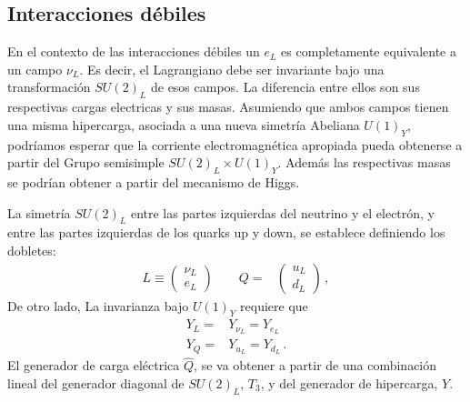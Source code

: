 \begin{frame}
\section{Interacciones débiles}
En el contexto de las interacciones débiles un $e_L$ es completamente
equivalente a un campo $\nu_L$. Es decir, el Lagrangiano debe ser
invariante bajo una transformación $SU(2)_L$ de esos campos. La
diferencia entre ellos son sus respectivas cargas electricas y sus
masas. Asumiendo que ambos campos tienen una misma hipercarga,
asociada a una nueva simetría Abeliana $U(1)_Y$, podríamos esperar que
la corriente electromagnética apropiada pueda obtenerse a partir del
Grupo semisimple $SU(2)_L\times U(1)_Y$. Además las respectivas masas
se podrían obtener a partir del mecanismo de Higgs.

La simetría $SU(2)_L$ entre las partes izquierdas del neutrino y el electrón, y entre las partes izquierdas de los quarks up y down, se establece  definiendo los dobletes:
  \begin{align}
    L\equiv\begin{pmatrix}
      \nu_L\\
      e_L      
    \end{pmatrix}\qquad   Q=&\begin{pmatrix}
    u_L\\
    d_L
  \end{pmatrix}\,,
  \end{align}
De otro lado, La invarianza bajo $U(1)_Y$ requiere que
\begin{align}
  Y_L=&Y_{\nu_L}=Y_{e_L}\nonumber\\
  Y_Q=&Y_{u_L}=Y_{d_L}\,.
\end{align}
El generador de carga eléctrica $\widehat{Q}$, se va obtener a partir de una combinación lineal del generador diagonal de $SU(2)_L$, $T_3$, y del generador de hipercarga, $Y$.


\end{frame}
